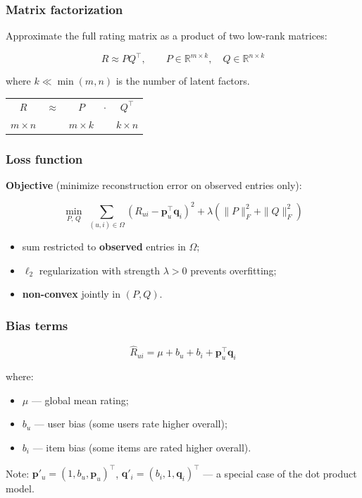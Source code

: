 \documentclass[]{beamer}
\begin{document}
\begin{frame}[fragile]
\frametitle{Matrix factorization}
Approximate the full rating matrix as a product of two low-rank matrices:

\begin{equation*}
R \approx P Q^\top, \qquad P \in \mathbb{R}^{m \times k},\quad Q \in \mathbb{R}^{n \times k}
\end{equation*}

where $k \ll \min(m, n)$ is the number of latent factors.


\vfill

\begin{center}
\begin{tabular}{ccccc}
$R$ & $\approx$ & $P$ & $\cdot$ & $Q^\top$ \\[2mm]
$m \times n$ & & $m \times k$ & & $k \times n$ \\
\end{tabular}
\end{center}

\end{frame}

\begin{frame}[fragile]
\frametitle{Loss function}
\textbf{Objective} (minimize reconstruction error on observed entries only):

\begin{equation*}
\min_{P,\,Q}\; \sum_{(u,i)\in\Omega} \left(R_{ui} - \mathbf{p}_u^\top \mathbf{q}_i\right)^2
  + \lambda\!\left(\|P\|_F^2 + \|Q\|_F^2\right)
\end{equation*}

\begin{itemize}
  \item sum restricted to \textbf{observed} entries in $\Omega$;
  \item $\ell_2$ regularization with strength $\lambda > 0$ prevents overfitting;
  \item \textbf{non-convex} jointly in $(P, Q)$.
\end{itemize}

\end{frame}

\begin{frame}[fragile]
\frametitle{Bias terms}
\begin{equation*}
\hat{R}_{ui} = \mu + b_u + b_i + \mathbf{p}_u^\top \mathbf{q}_i
\end{equation*}

where:
\begin{itemize}
  \item $\mu$ --- global mean rating;
  \item $b_u$ --- user bias (some users rate higher overall);
  \item $b_i$ --- item bias (some items are rated higher overall).
\end{itemize}

Note: $\mathbf{p}'_u = (1, b_u, \mathbf{p}_u)^\top$, $\mathbf{q}'_i = (b_i, 1, \mathbf{q}_i)^\top$ --- a special case of the dot product model.

\end{frame}
\end{document}
